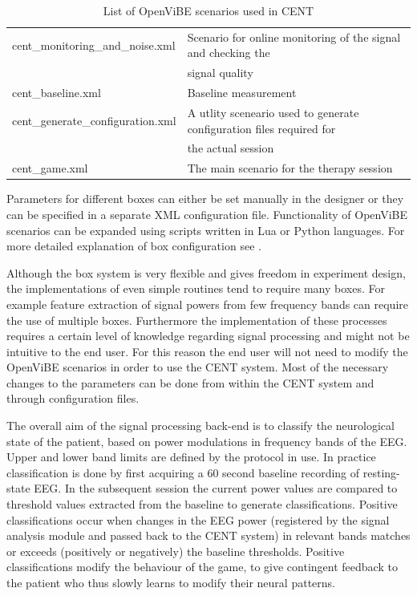 \begin{table}[h]
\centering
\begin{tabular}{ll}
	\hline
	cent\_monitoring\_and\_noise.xml & Scenario for online monitoring of the 
	signal and checking the \\
	&  signal quality \\
	\noalign{\smallskip}
	cent\_baseline.xml & Baseline measurement \\
	\noalign{\smallskip}
	cent\_generate\_configuration.xml & A utlity sceneario used to generate configuration files required for \\
	& the actual session \\
	\noalign{\smallskip}
	cent\_game.xml & The main scenario for the therapy session \\
	\hline
\end{tabular}
    \caption{List of OpenViBE scenarios used in CENT}\label{scenariolist}
\end{table}

Parameters for different boxes can either be set manually in the designer or they can be specified in a separate XML configuration file. Functionality of OpenViBE scenarios can be expanded using scripts written in Lua or Python languages. For more detailed explanation of box configuration see \cite{renard2010openvibe}.

Although the box system is very flexible and gives freedom in experiment design, the implementations of even simple routines tend to require many boxes. For example feature extraction of signal powers from few frequency bands can require the use of multiple boxes. Furthermore the implementation of these processes requires a certain level of knowledge regarding signal processing and might not be intuitive to the end user. For this reason the end user will not need to modify the OpenViBE scenarios in order to use the CENT system. Most of the necessary changes to the parameters can be done from within the CENT system and through configuration files.

The overall aim of the signal processing back-end is to classify the neurological state of the patient, based on power modulations in frequency bands of the EEG. Upper and lower band limits are defined by the protocol in use. In practice classification is done by first acquiring a 60 second baseline recording of resting-state EEG. In the subsequent session the current power values are compared to threshold values extracted from the baseline to generate classifications. Positive classifications occur when changes in the EEG power (registered by the signal analysis module and passed back to the CENT system) in relevant bands matches or exceeds (positively or negatively) the baseline thresholds. Positive classifications modify the behaviour of the game, to give contingent feedback to the patient who thus slowly learns to modify their neural patterns.

